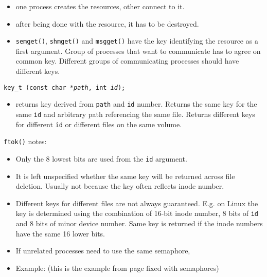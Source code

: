 

\begin{slide}
\begin{itemize}
\item one process creates the resources, other connect to it.
\item after being done with the resource, it has to be destroyed.
\item \texttt{semget()}, \texttt{shmget()} and
\texttt{msgget()} have the key identifying the resource as a first argument.
Group of processes that want to communicate has to agree on common key.
Different groups of communicating processes should have different keys.
\end{itemize}
\texttt{key\_t (const char *\emph{path}, int \emph{id});}
\begin{itemize}
\item returns key derived from \texttt{path} and \texttt{id} number.
Returns the same key for the same \texttt{id} and arbitrary path referencing the
same file. Returns different keys for different \texttt{id} or different files
on the same volume.
\end{itemize}
\end{slide}

\label{FTOK} \texttt{ftok()} notes:
\begin{itemize}
\item Only the 8 lowest bits are used from the \texttt{id} argument.
\item It is left unspecified whether the same key will be returned across file
deletion. Usually not because the key often reflects inode number.
\item Different keys for different files are not always guaranteed. E.g. on
Linux the key is determined using the combination of 16-bit inode number, 8 bits
of \texttt{id} and 8 bits of minor device number. Same key is returned if the
inode numbers have the same 16 lower bits.
\item If unrelated processes need to use the same semaphore, 
\item \label{SEM_FIXED_RACE_C} Example: 
(this is the  example from page \pageref{RACE_C} fixed
with semaphores)
\end{itemize}

\endinput
